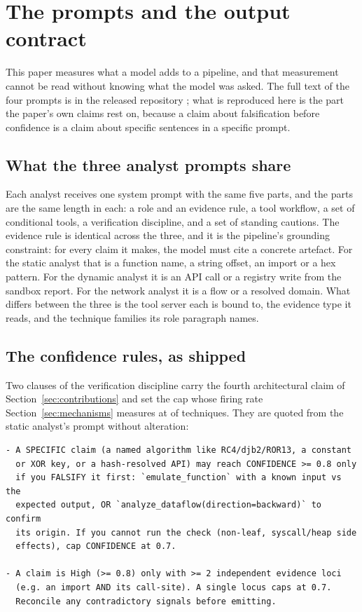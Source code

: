\section{The prompts and the output contract}
\label{sec:prompts}

This paper measures what a model adds to a pipeline, and that measurement cannot be read without
knowing what the model was asked. The full text of the four prompts is in the released repository
\cite{release2026artefact}; what is reproduced here is the part the paper's own claims rest on,
because a claim about falsification before confidence is a claim about specific sentences in a
specific prompt.

\subsection{What the three analyst prompts share}\label{prompt-shape}

Each analyst receives one system prompt with the same five parts, and the parts are the same
length in each: a role and an evidence rule, a tool workflow, a set of conditional tools, a
verification discipline, and a set of standing cautions. The evidence rule is identical across the three, and it is the pipeline's grounding constraint: for
every claim it makes, the model must cite a concrete artefact. For the static analyst that is a
function name, a string offset, an import or a hex pattern. For the dynamic analyst it is an API
call or a registry write from the sandbox report. For the network analyst it is a flow or a resolved
domain. What differs between the three
is the tool server each is bound to, the evidence type it reads, and the technique families its
role paragraph names.

\subsection{The confidence rules, as shipped}\label{prompt-confidence}

Two clauses of the verification discipline carry the fourth architectural claim of
Section~\ref{sec:contributions} and set the cap whose firing rate Section~\ref{sec:mechanisms}
measures at  of techniques. They are quoted from the static analyst's prompt
without alteration:

\begin{verbatim}
- A SPECIFIC claim (a named algorithm like RC4/djb2/ROR13, a constant
  or XOR key, or a hash-resolved API) may reach CONFIDENCE >= 0.8 only
  if you FALSIFY it first: `emulate_function` with a known input vs the
  expected output, OR `analyze_dataflow(direction=backward)` to confirm
  its origin. If you cannot run the check (non-leaf, syscall/heap side
  effects), cap CONFIDENCE at 0.7.

- A claim is High (>= 0.8) only with >= 2 independent evidence loci
  (e.g. an import AND its call-site). A single locus caps at 0.7.
  Reconcile any contradictory signals before emitting.
\end{verbatim}

